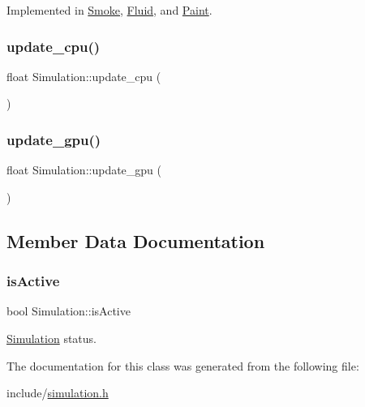 Implemented in \mbox{\hyperlink{classSmoke_aca6f4c3a6e62bf27920229c5b53ae561}{Smoke}}, \mbox{\hyperlink{classFluid_af249a75d7ef113842c226b8b939c8f90}{Fluid}}, and \mbox{\hyperlink{classPaint_a1f01fcd27e595cc9aacd1ef94e3e1454}{Paint}}.

\mbox{\label{classSimulation_a36aefdee44fabe9b8070363ca9eb80a7}} 
\subsubsection{\texorpdfstring{update\_cpu()}{update\_cpu()}}
{\footnotesize\ttfamily float Simulation\+::update\+\_\+cpu (\begin{DoxyParamCaption}{ }\end{DoxyParamCaption})\hspace{0.3cm}{\ttfamily [inline]}}

\mbox{\label{classSimulation_a16ab6b7e3c5936bae78fc8c2daf658d2}} 
\subsubsection{\texorpdfstring{update\_gpu()}{update\_gpu()}}
{\footnotesize\ttfamily float Simulation\+::update\+\_\+gpu (\begin{DoxyParamCaption}{ }\end{DoxyParamCaption})\hspace{0.3cm}{\ttfamily [inline]}}



\subsection{Member Data Documentation}
\mbox{\label{classSimulation_ad76dc6e6d56b95b074f3824340f91a4c}} 
\subsubsection{\texorpdfstring{isActive}{isActive}}
{\footnotesize\ttfamily bool Simulation\+::is\+Active\hspace{0.3cm}{\ttfamily [private]}}



\mbox{\hyperlink{classSimulation}{Simulation}} status. 



The documentation for this class was generated from the following file\+:\begin{DoxyCompactItemize}
\item 
include/\mbox{\hyperlink{simulation_8h}{simulation.\+h}}\end{DoxyCompactItemize}
